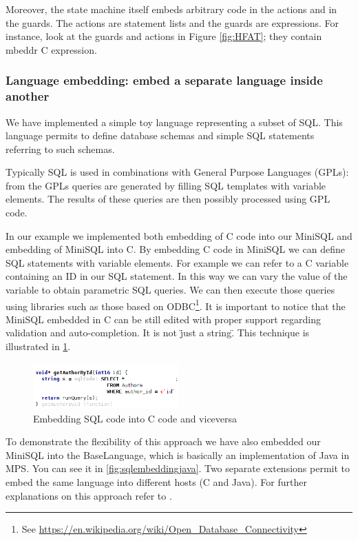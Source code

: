 \documentclass[preprint,numbers,10pt]{sigplanconf}
\begin{document}
Moreover, the state machine itself embeds arbitrary code in the actions
and in the guards. The actions are statement lists and the guards are expressions.
For instance, look at the guards and actions in Figure \ref{fig:HFAT}; they contain mbeddr C expression.

\subsubsection{Language embedding: embed a separate language inside another}

We have implemented a simple toy language representing a subset of SQL. This language permits to define database schemas and simple SQL statements referring to such schemas.

Typically SQL is used in combinations with General Purpose Languages (GPLs): from the GPLs queries are generated by filling SQL templates with variable elements. The results of these queries are then possibly processed using GPL code.

In our example we implemented both embedding of C code into our MiniSQL and embedding of MiniSQL into C.
By embedding C code in MiniSQL we can define SQL statements with variable elements. For example we can refer to a C variable containing an ID in our SQL statement. In this way we can vary the value of the variable to obtain parametric SQL queries. We can then execute those queries using libraries such as those based on ODBC\footnote{See \url{https://en.wikipedia.org/wiki/Open_Database_Connectivity}}. It is important to notice that the MiniSQL embedded in C can be still edited with proper support regarding validation and auto-completion. It is not \"just a string\".
This technique is illustrated in \ref{fig:sqlembedding}.

\begin{figure}[p]
	\centering
	\includegraphics[width=0.50\textwidth]{screens/minisql_embedded.png}
	\caption{Embedding SQL code into C code and viceversa}
	\label{fig:sqlembedding}
\end{figure}

To demonstrate the flexibility of this approach we have also embedded our MiniSQL into the BaseLanguage, which is basically an implementation of Java in MPS. You can see it in \ref{fig:sqlembeddingjava}. Two separate extensions permit to embed the same language into different hosts (C and Java). For further explanations on this approach refer to \cite{Tomassetti2013}.
\end{document}
